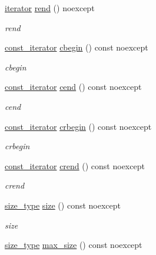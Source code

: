 \begin{DoxyCompactItemize}
\hyperlink{classIceBRG_1_1element__accessor_a464911efedf30917f238c5fb4746cd09}{iterator} \hyperlink{classIceBRG_1_1element__accessor_afb9c46d9df82f458063501bdf7e55a39}{rend} () noexcept
\begin{DoxyCompactList}\small\item\em rend \end{DoxyCompactList}\item 
\hyperlink{classIceBRG_1_1element__accessor_ab9a6ca4866a0758171a4ffa7b0935cd2}{const\+\_\+iterator} \hyperlink{classIceBRG_1_1element__accessor_aad89c91911287ce94874b95e7d387ca9}{cbegin} () const  noexcept
\begin{DoxyCompactList}\small\item\em cbegin \end{DoxyCompactList}\item 
\hyperlink{classIceBRG_1_1element__accessor_ab9a6ca4866a0758171a4ffa7b0935cd2}{const\+\_\+iterator} \hyperlink{classIceBRG_1_1element__accessor_a63245eb2ae629a99d783eee946712ba8}{cend} () const  noexcept
\begin{DoxyCompactList}\small\item\em cend \end{DoxyCompactList}\item 
\hyperlink{classIceBRG_1_1element__accessor_ab9a6ca4866a0758171a4ffa7b0935cd2}{const\+\_\+iterator} \hyperlink{classIceBRG_1_1element__accessor_a1467e420b5eeb2939e83104747c1d2ca}{crbegin} () const  noexcept
\begin{DoxyCompactList}\small\item\em crbegin \end{DoxyCompactList}\item 
\hyperlink{classIceBRG_1_1element__accessor_ab9a6ca4866a0758171a4ffa7b0935cd2}{const\+\_\+iterator} \hyperlink{classIceBRG_1_1element__accessor_a88d68973f607f9baa64c2804f4f5d01e}{crend} () const  noexcept
\begin{DoxyCompactList}\small\item\em crend \end{DoxyCompactList}\item 
\hyperlink{classIceBRG_1_1element__accessor_aec3d016f3c5e84e7f9248669a9571208}{size\+\_\+type} \hyperlink{classIceBRG_1_1element__accessor_aee036852e878483ead629bbd56a02db9}{size} () const  noexcept
\begin{DoxyCompactList}\small\item\em size \end{DoxyCompactList}\item 
\hyperlink{classIceBRG_1_1element__accessor_aec3d016f3c5e84e7f9248669a9571208}{size\+\_\+type} \hyperlink{classIceBRG_1_1element__accessor_a7c9d2d8c46ed2f24d5f7c479b993c914}{max\+\_\+size} () const  noexcept

\end{DoxyCompactItemize}

